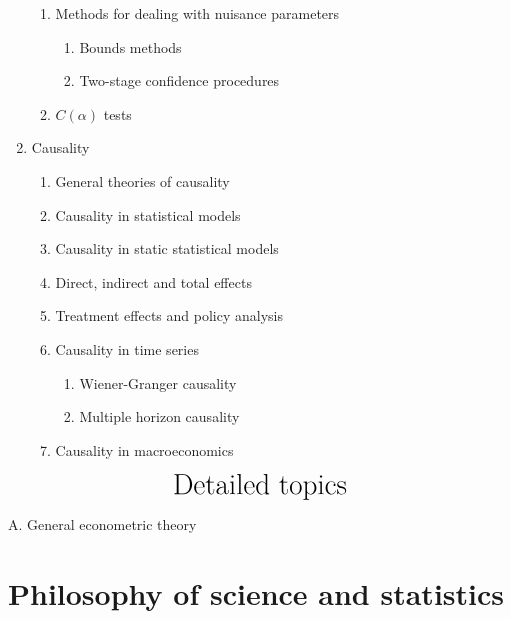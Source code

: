 \documentclass[titlepage,11pt,amstex]{article}
\begin{document}
\begin{enumerate}
\begin{enumerate}
\item Methods for dealing with nuisance parameters

\begin{enumerate}
\item Bounds methods

\item Two-stage confidence procedures
\end{enumerate}

\item $C(\alpha )$ tests
\end{enumerate}

\item Causality

\begin{enumerate}
\item General theories of causality

\item Causality in statistical models

\item Causality in static statistical models

\item Direct, indirect and total effects

\item Treatment effects and policy analysis

\item Causality in time series

\begin{enumerate}
\item Wiener-Granger causality

\item Multiple horizon causality
\end{enumerate}

\item Causality in macroeconomics
\end{enumerate}
\end{enumerate}

\newpage

\begin{equation*}
\text{{\huge Detailed topics}}
\end{equation*}

\begin{center}
{\Huge A. General econometric theory}
\end{center}

\quad

\section{\textbf{Philosophy of science and statistics \label{Philosophy of
science and statistics}}}
\end{document}
